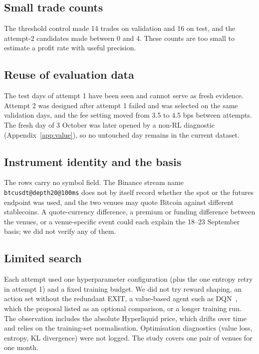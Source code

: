 \documentclass[12pt,a4paper]{article}
\DeclareRobustCommand{\bps}{\ifmmode\,\text{bps}\else\,bps\fi}
\begin{document}
\subsection{Small trade counts}\label{sec:counts}
The threshold control made 14 trades on validation and 16 on test, and the attempt-2
candidates made between 0 and 4. These counts are too small to estimate a profit rate with
useful precision.

\subsection{Reuse of evaluation data}
The test days of attempt 1 have been seen and cannot serve as fresh evidence. Attempt 2 was
designed after attempt 1 failed and was selected on the same validation days, and the fee
setting moved from 3.5 to 4.5\bps{} between attempts. The fresh day of 3 October was later
opened by a non-RL diagnostic (Appendix~\ref{app:value}), so no untouched day remains in the
current dataset.

\subsection{Instrument identity and the basis}\label{sec:identity}
The rows carry no symbol field. The Binance stream name \texttt{btcusdt@depth20@100ms} does
not by itself record whether the spot or the futures endpoint was used, and the two venues
may quote Bitcoin against different stablecoins. A quote-currency difference, a premium or
funding difference between the venues, or a venue-specific event could each explain the
18--23 September basis; we did not verify any of them.

\subsection{Limited search}\label{sec:search}
Each attempt used one hyperparameter configuration (plus the one entropy retry in attempt 1)
and a fixed training budget. We did not try reward shaping, an action set without the
redundant EXIT, a value-based agent such as DQN~\cite{dqn}, which the proposal listed as an
optional comparison, or a longer training run. The observation includes the absolute
Hyperliquid price, which drifts over time and relies on the training-set normalisation.
Optimisation diagnostics (value loss, entropy, KL divergence) were not logged. The study
covers one pair of venues for one month.

\end{document}
